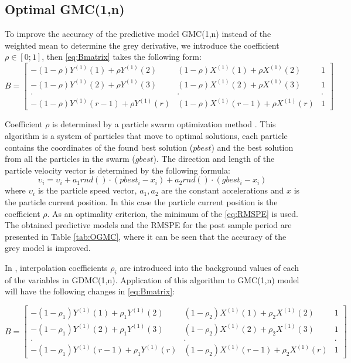 \documentclass[AMS,STIX2COL]{WileyNJD-v2}
\begin{document}
\subsection{Optimal GMC(1,n)}
To improve the accuracy of the predictive model GMC(1,n) instead of the weighted mean to determine the grey derivative, we introduce the coefficient $\rho \in [0;1]$, then \eqref{eq:Bmatrix} takes the following  form:
\begin{equation}
B = \begin{bmatrix}
-(1-\rho)Y^{(1)}(1)+\rho Y^{(1)}(2) & (1-\rho)X^{(1)}(1)+\rho X^{(1)}(2) & 1 \\ 
-(1-\rho)Y^{(1)}(2)+\rho Y^{(1)}(3) & (1-\rho)X^{(1)}(2)+\rho X^{(1)}(3) & 1 \\
. & . & .\\
-(1-\rho)Y^{(1)}(r-1)+\rho Y^{(1)}(r) &(1-\rho)X^{(1)}(r-1)+\rho X^{(1)}(r) & 1
\end{bmatrix}
\end{equation}

Coefficient $\rho$ is determined by a particle swarm optimization method \cite{Kennedy1995}. This algorithm is a system of particles that move to optimal solutions, each particle contains the coordinates of the found best solution ($pbest$) and the best solution from all the particles in the swarm ($gbest$). The direction and length of the particle velocity vector is determined by the following formula:
\begin{equation} \label{PSO}
\upsilon_i = \upsilon_i + a_1rnd()\cdot (pbest_i-x_i)+a_2rnd()\cdot(gbest_i-x_i)
\end{equation}
where $\upsilon_i$  is the particle speed vector, $a_1, a_2$   are the constant accelerations and $x$  is the particle current position. In this case the particle current position is the coefficient $\rho$. As an optimality criterion, the minimum of the \eqref{eq:RMSPE} is used. The obtained predictive models and the RMSPE for the post sample period are presented in Table \ref{tab:OGMC}, where it can be seen that the accuracy of the grey model is improved.

In \cite{Wang2014}, interpolation coefficients $\rho_i$ are introduced into the background values of each of the variables in GDMC(1,n). Application of this algorithm to GMC(1,n) model will have the following changes in \eqref{eq:Bmatrix}:

\begin{equation}
B = \begin{bmatrix}
-(1-\rho_1)Y^{(1)}(1)+\rho_1 Y^{(1)}(2) & (1-\rho_2)X^{(1)}(1)+\rho_2 X^{(1)}(2) & 1 \\ 
-(1-\rho_1)Y^{(1)}(2)+\rho_1 Y^{(1)}(3) & (1-\rho_2)X^{(1)}(2)+\rho_2 X^{(1)}(3) & 1 \\
. & . & .\\
-(1-\rho_1)Y^{(1)}(r-1)+\rho_1 Y^{(1)}(r) &(1-\rho_2)X^{(1)}(r-1)+\rho_2 X^{(1)}(r) & 1
\end{bmatrix}
\end{equation}
\end{document}
